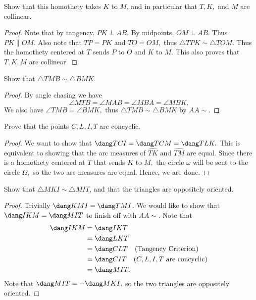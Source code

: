 \documentclass[letterpaper,oneside]{scrartcl}
\begin{document}
\begin{problem*}
  [4.31]
  Show that this homothety takes $K$ to $M$, and in particular that $T,K,$ and $M$ are collinear.
\end{problem*}
\begin{proof}
  Note that by tangency, $PK \perp AB.$ By midpoints, $OM \perp AB.$ Thus $PK \parallel OM.$ Also note that $TP=PK$ and $TO=OM,$ thus $\triangle TPK \sim \triangle TOM.$ Thus the homothety centered at $T$ sends $P$ to $O$ and $K$ to $M.$ This also proves that $T,K,M$ are collinear. 
\end{proof}
\begin{problem*}
  [4.32]
  Show that $\triangle TMB \sim \triangle BMK.$
\end{problem*}
\begin{proof}
  By angle chasing we have
  $$\angle MTB = \angle MAB = \angle MBA = \angle MBK.$$
  We also have $\angle TMB = \angle BMK,$ thus $\triangle TMB \sim \triangle BMK$ by $AA\sim$.
\end{proof}
\begin{problem*}
  Prove that the points $C,L,I,T$ are concyclic.
\end{problem*}
\begin{proof}
  We want to show that $\dang TCI = \dang TCM = \dang TLK.$ This is equivalent to showing that the arc measures of $\widehat{TK}$ and $\widehat{TM}$ are equal. Since there is a homothety centered at $T$ that sends $K$ to $M,$ the circle $\omega$ will be sent to the circle $\Omega,$ so the two arc measures are equal. Hence, we are done.
\end{proof}
\begin{problem*}
   Show that \(\triangle MKI \sim \triangle MIT\), and that the triangles are oppositely oriented. 
\end{problem*}
\begin{proof}
  Trivially \(\dang KMI = \dang TMI\). We would like to show that \(\dang IKM = \dang MIT\) to finish off with \(AA \sim\). Note that 
  \begin{align*}
    \dang IKM &= \dang IKT \\
    &= \dang LKT \\
    &= \dang CLT \quad \text{(Tangency Criterion)}\\
    &= \dang CIT \quad (C,L,I,T \text{ are concyclic})\\
    &= \dang MIT.
  \end{align*}
  Note that \(\dang MIT = -\dang MKI,\) so the two triangles are oppositely oriented.
\end{proof}
\end{document}
